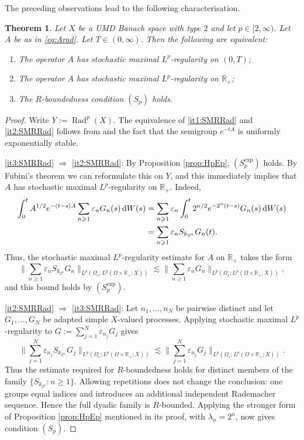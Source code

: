 \documentclass{amsart}
\let\geq\geqslant
\theoremstyle{plain}
\newtheorem{theorem}{Theorem}[section]
\theoremstyle{remark}
\theoremstyle{plain}
\numberwithin{equation}{section}
\newcommand{\R}{\mathbb R}
\newcommand{\1}{\mathbf 1}
\newcommand{\dd}{\,{\rm d}}
\newcommand{\Rad}{\operatorname{Rad}}
\begin{document}
The preceding observations lead to the following characterisation.
\begin{theorem}\label{thm:SMRRad}
Let $X$ be a UMD Banach space with type $2$ and let $p\in [2, \infty)$. Let $A$ be as in \eqref{eq:Arad}. Let $T\in (0,\infty)$. Then the following are equivalent:
\begin{enumerate}[label={\rm(\arabic*)}, leftmargin=*]
\item\label{it1:SMRRad} The operator $A$ has stochastic maximal $L^p$-regularity on $(0,T)$;
\item\label{it2:SMRRad} The operator $A$ has stochastic maximal $L^p$-regularity on $\R_+$;
\item\label{it3:SMRRad} The $R$-boundedness condition $(S_p)$ holds.
\end{enumerate}
\end{theorem}

\begin{proof}
Write $Y:=\Rad^p(X)$. The equivalence of \ref{it1:SMRRad} and \ref{it2:SMRRad} follows from \cite{AV19} and the fact that the semigroup $e^{-tA}$ is uniformly exponentially stable.

\ref{it3:SMRRad} $\Rightarrow$ \ref{it2:SMRRad}: By Proposition \ref{prop:HpEp}, $(S_p^{\exp})$ holds. By Fubini's theorem we can reformulate this on $Y$, and this immediately implies that $A$ has stochastic maximal $L^p$-regularity on $\R_+$. Indeed,
\[
\begin{aligned}
    \int_0^t A^{1/2}e^{-(t-s)A}\sum_{n\geq 1}\varepsilon_n G_n(s)\dd W(s)
    &=
    \sum_{n\geq 1}\varepsilon_n
    \int_0^t 2^{n/2}e^{-2^n(t-s)}G_n(s)\dd W(s)       \\
    &=
    \sum_{n\geq 1}\varepsilon_n S_{k_{2^n}}G_n(t).
\end{aligned}
\]
Thus, the stochastic maximal $L^p$-regularity estimate for $A$ on $\R_+$ takes the form
\[
    \Big\|
        \sum_{n\geq 1}\varepsilon_n S_{k_{2^n}} G_n
    \Big\|_{L^p(\Omega_\varepsilon;L^p(\Omega\times\R_+;X))}
    \lesssim
    \Big\|
        \sum_{n\geq 1}\varepsilon_n G_n
    \Big\|_{L^p(\Omega_\varepsilon;
        L^p(\Omega\times\R_+;X))},
\]
and this bound holds by $(S_p^{\exp})$.

\smallskip

\ref{it2:SMRRad} $\Rightarrow$ \ref{it3:SMRRad}:
Let $n_1,\ldots,n_N$ be pairwise distinct and let $G_1,\ldots,G_N$ be adapted simple $X$-valued processes. Applying stochastic maximal $L^p$-regularity to
\(G:=\sum_{j=1}^N\varepsilon_{n_j}G_j\)
gives
\[
\Big\|
\sum_{j=1}^N
\varepsilon_{n_j}S_{k_{2^{n_j}}}G_j
\Big\|_{L^p(\Omega_\varepsilon;
L^p(\Omega\times\R_+;X))}
\lesssim
\Big\|
\sum_{j=1}^N
\varepsilon_{n_j}G_j
\Big\|_{L^p(\Omega_\varepsilon;
L^p(\Omega\times\R_+;X))}.
\]
Thus the estimate required for $R$-boundedness holds for distinct members of the family $  \{S_{k_{2^n}}:n\geq1\}.$
Allowing repetitions does not change the conclusion: one groups equal indices and introduces an additional independent Rademacher sequence. Hence the full dyadic family is $R$-bounded.
Applying the stronger form of Proposition \ref{prop:HpEp} mentioned in its proof, with
$\lambda_n=2^n$, now gives condition $(S_p)$.
\end{proof}
\end{document}
